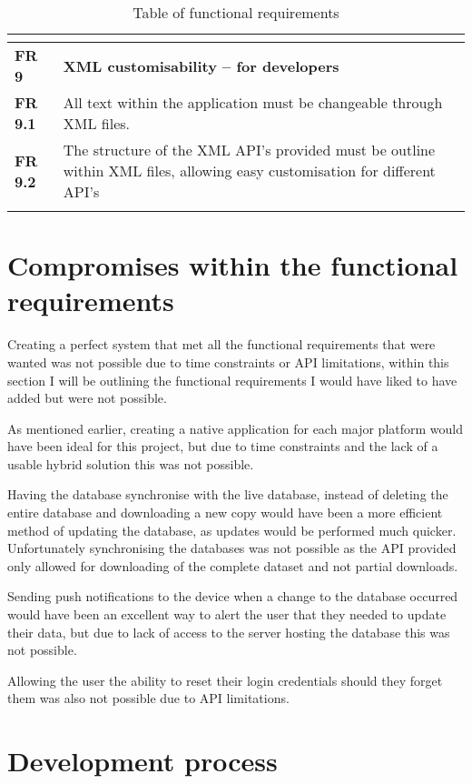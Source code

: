 \begin{center}
\begin{longtable}{| l | p{12cm} |}
\textbf{}  &  \\ \hline
\textbf{FR 9}   & \textbf{XML customisability – for developers} \\ \hline
\textbf{FR 9.1} & All text within the application must be changeable through XML files.  \\ \hline
\textbf{FR 9.2} & The structure of the XML API’s provided must be outline within XML files, allowing easy customisation for different API’s\\ \hline 
\caption{Table of functional requirements}
\end{longtable}
\end{center}

\section{Compromises within the functional requirements }

Creating a perfect system that met all the functional requirements that were wanted was not possible due to time constraints or API limitations, within this section I will be outlining the functional requirements I would have liked to have added but were not possible.

As mentioned earlier, creating a native application for each major platform would have been ideal for this project, but due to time constraints and the lack of a usable hybrid solution this was not possible.

Having the database synchronise with the live database, instead of deleting the entire database and downloading a new copy would have been a more efficient method of updating the database, as updates would be performed much quicker. Unfortunately synchronising the databases was not possible as the API provided only allowed for downloading of the complete dataset and not partial downloads.

Sending push notifications to the device when a change to the database occurred would have been an excellent way to alert the user that they needed to update their data, but due to lack of access to the server hosting the database this was not possible. 

Allowing the user the ability to reset their login credentials should they forget them was also not possible due to API limitations.

\section{Development process}

